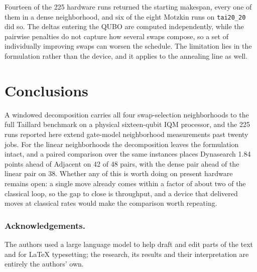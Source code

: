 \documentclass[runningheads]{llncs}
\begin{document}
Fourteen of the 225 hardware runs returned the starting makespan, every one of
them in a dense neighborhood, and six of the eight Motzkin runs on
\texttt{tai20\_20} did so. The deltas entering the QUBO are computed
independently, while the pairwise penalties do not capture how several swaps
compose, so a set of individually improving swaps can worsen the schedule. The
limitation lies in the formulation rather than the device, and it applies to the
annealing line as well.

\section{Conclusions}
\label{sec:conclusions}
A windowed decomposition carries all four swap-selection neighborhoods to the
full Taillard benchmark on a physical sixteen-qubit IQM processor, and the 225
runs reported here extend gate-model neighborhood measurements past twenty jobs.
For the linear neighborhoods the decomposition leaves the formulation intact,
and a paired comparison over the same instances places Dynasearch 1.84 points
ahead of Adjacent on 42 of 48 pairs, with the dense pair ahead of the linear
pair on 38. Whether any of this is worth doing on present hardware remains open:
a single move already comes within a factor of about two of the classical loop,
so the gap to close is throughput, and a device that delivered moves at
classical rates would make the comparison worth repeating.

\subsubsection{Acknowledgements.}
The authors used a large language model to help draft and edit parts of the
text and for LaTeX typesetting; the research, its results and their
interpretation are entirely the authors' own.
\end{document}
